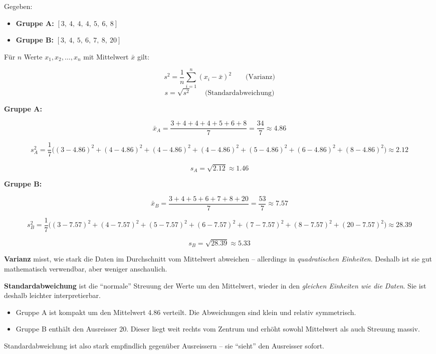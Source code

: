 \begin{aufgabe}{2}

Gegeben:

\begin{itemize}
  \item \textbf{Gruppe A:} $[3,\ 4,\ 4,\ 4,\ 5,\ 6,\ 8]$
  \item \textbf{Gruppe B:} $[3,\ 4,\ 5,\ 6,\ 7,\ 8,\ 20]$
\end{itemize}

Für $n$ Werte $x_1, x_2, \dots, x_n$ mit Mittelwert $\bar{x}$ gilt:

\[
s^2 = \frac{1}{n} \sum_{i=1}^{n} (x_i - \bar{x})^2 \qquad \text{(Varianz)}
\]
\[
s = \sqrt{s^2} \qquad \text{(Standardabweichung)}
\]

\textbf{Gruppe A:}

\[
\bar{x}_A = \frac{3 + 4 + 4 + 4 + 5 + 6 + 8}{7} = \frac{34}{7} \approx 4.86
\]

\[
s^2_A = \frac{1}{7} \big((3-4.86)^2 + (4-4.86)^2 + (4-4.86)^2 + (4-4.86)^2 + (5-4.86)^2 + (6-4.86)^2 + (8-4.86)^2\big) \approx 2.12
\]

\[
s_A = \sqrt{2.12} \approx 1.46
\]

\textbf{Gruppe B:}

\[
\bar{x}_B = \frac{3 + 4 + 5 + 6 + 7 + 8 + 20}{7} = \frac{53}{7} \approx 7.57
\]

\[
s^2_B = \frac{1}{7} \big((3-7.57)^2 + (4-7.57)^2 + (5-7.57)^2 + (6-7.57)^2 + (7-7.57)^2 + (8-7.57)^2 + (20-7.57)^2\big) \approx 28.39
\]

\[
s_B = \sqrt{28.39} \approx 5.33
\]

\textbf{Varianz} misst, wie stark die Daten im Durchschnitt vom Mittelwert abweichen – allerdings in \emph{quadratischen Einheiten}. Deshalb ist sie gut mathematisch verwendbar, aber weniger anschaulich.

\textbf{Standardabweichung} ist die ``normale'' Streuung der Werte um den Mittelwert, wieder in den \emph{gleichen Einheiten wie die Daten}. Sie ist deshalb leichter interpretierbar.

\begin{itemize}
  \item Gruppe A ist kompakt um den Mittelwert 4.86 verteilt. Die Abweichungen sind klein und relativ symmetrisch.
  \item Gruppe B enthält den Ausreisser $20$. Dieser liegt weit rechts vom Zentrum und erhöht sowohl Mittelwert als auch Streuung massiv.
\end{itemize}

Standardabweichung ist also stark empfindlich gegenüber Ausreissern – sie ``sieht'' den Ausreisser sofort.

\end{aufgabe}

